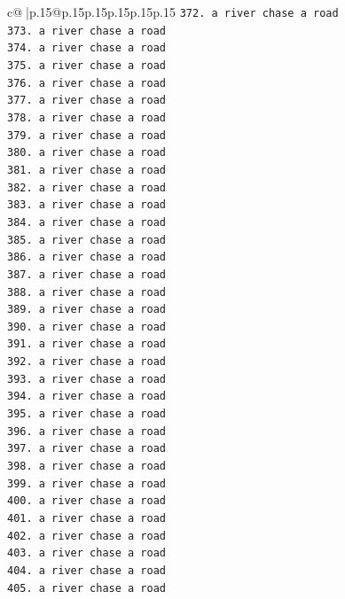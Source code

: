 \documentclass{article}
\begin{document}
{\begin{supertabular}{c@{$\;$}|p{.15\linewidth}@{}p{.15\linewidth}p{.15\linewidth}p{.15\linewidth}p{.15\linewidth}p{.15\linewidth}}
{{{\texttt{372. a river chase a road} \\
\texttt{373. a river chase a road} \\
\texttt{374. a river chase a road} \\
\texttt{375. a river chase a road} \\
\texttt{376. a river chase a road} \\
\texttt{377. a river chase a road} \\
\texttt{378. a river chase a road} \\
\texttt{379. a river chase a road} \\
\texttt{380. a river chase a road} \\
\texttt{381. a river chase a road} \\
\texttt{382. a river chase a road} \\
\texttt{383. a river chase a road} \\
\texttt{384. a river chase a road} \\
\texttt{385. a river chase a road} \\
\texttt{386. a river chase a road} \\
\texttt{387. a river chase a road} \\
\texttt{388. a river chase a road} \\
\texttt{389. a river chase a road} \\
\texttt{390. a river chase a road} \\
\texttt{391. a river chase a road} \\
\texttt{392. a river chase a road} \\
\texttt{393. a river chase a road} \\
\texttt{394. a river chase a road} \\
\texttt{395. a river chase a road} \\
\texttt{396. a river chase a road} \\
\texttt{397. a river chase a road} \\
\texttt{398. a river chase a road} \\
\texttt{399. a river chase a road} \\
\texttt{400. a river chase a road} \\
\texttt{401. a river chase a road} \\
\texttt{402. a river chase a road} \\
\texttt{403. a river chase a road} \\
\texttt{404. a river chase a road} \\
\texttt{405. a river chase a road} \\
}}}
\end{supertabular}}
\end{document}
